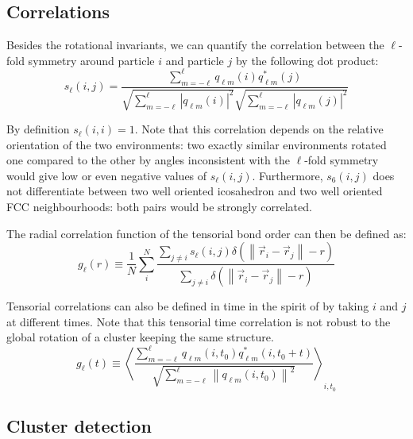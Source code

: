 \subsection{Correlations}
\label{sec:boo_correl}

Besides the rotational invariants, we can quantify the correlation between the $\ell$-fold symmetry around particle $i$ and particle $j$ by the following dot product:
\begin{equation}
	s_\ell(i,j) = \frac{
		\sum_{m=-\ell}^{\ell} q_{\ell m}(i) q_{\ell m}^{*}(j)
	}{
		\sqrt{\sum_{m=-\ell}^{\ell} |q_{\ell m}(i)|^2} \sqrt{\sum_{m=-\ell}^{\ell} |q_{\ell m}(j)|^2}
	}
	\label{eq:boo_dot_product}
\end{equation}

By definition $s_\ell(i,i)=1$. Note that this correlation depends on the relative orientation of the two environments: two exactly similar environments rotated one compared to the other by angles inconsistent with the $\ell$-fold symmetry would give low or even negative values of $s_\ell(i,j)$. Furthermore, $s_6(i,j)$ does not differentiate between two well oriented icosahedron and two well oriented \ac{FCC} neighbourhoods: both pairs would be strongly correlated.

The radial correlation function of the tensorial bond order can then be defined as:
\begin{equation}
	g_\ell(r) \equiv \frac{1}{N}\sum_i^N \frac{
		\sum_{j \neq i}{ s_\ell(i,j) \delta\left(\left\|\vec{r}_i-\vec{r}_j \right\| - r \right)}
	}{
	\sum_{j \neq i}{\delta\left(\left\|\vec{r}_i-\vec{r}_j \right\| - r \right)}
	}
	\label{eq:boo_space_correl}
\end{equation}

Tensorial correlations can also be defined in time in the spirit of  by taking $i$ and $j$ at different times. Note that this tensorial time correlation is not robust to the global rotation of a cluster keeping the same structure.
\begin{equation}
	g_\ell(t) \equiv \left\langle \frac{
		\sum_{m=-\ell}^{\ell} q_{\ell m}(i, t_0) q_{\ell m}^{*}(i, t_0+t)
	}{
		\sqrt{\sum_{m=-\ell}^{\ell} \left\|q_{\ell m}(i,t_0)\right\|^2}
	}\right\rangle_{i, t_0}
	\label{eq:boo_time_correl}
\end{equation}


\subsection{Cluster detection}
\label{sec:X_bonds}


